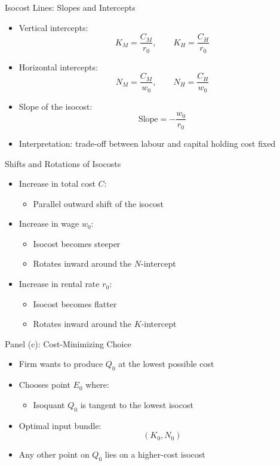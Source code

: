 \documentclass[aspectratio=169]{beamer}
\begin{document}

\begin{frame}{Isocost Lines: Slopes and Intercepts}
\begin{itemize}
\item Vertical intercepts:
\[
K_M = \frac{C_M}{r_0}, \qquad K_H = \frac{C_H}{r_0}
\]
\item Horizontal intercepts:
\[
N_M = \frac{C_M}{w_0}, \qquad N_H = \frac{C_H}{w_0}
\]
\item Slope of the isocost:
\[
\text{Slope} = -\frac{w_0}{r_0}
\]
\item Interpretation: trade-off between labour and capital holding cost fixed
\end{itemize}
\end{frame}


\begin{frame}{Shifts and Rotations of Isocosts}
\begin{itemize}
\item Increase in total cost $C$:
\begin{itemize}
\item Parallel outward shift of the isocost
\end{itemize}
\item Increase in wage $w_0$:
\begin{itemize}
\item Isocost becomes steeper
\item Rotates inward around the $N$-intercept
\end{itemize}
\item Increase in rental rate $r_0$:
\begin{itemize}
\item Isocost becomes flatter
\item Rotates inward around the $K$-intercept
\end{itemize}
\end{itemize}
\end{frame}


\begin{frame}{Panel (c): Cost-Minimizing Choice}
\begin{itemize}
\item Firm wants to produce $Q_0$ at the lowest possible cost
\item Chooses point $E_0$ where:
\begin{itemize}
\item Isoquant $Q_0$ is tangent to the lowest isocost
\end{itemize}
\item Optimal input bundle:
\[
(K_0, N_0)
\]
\item Any other point on $Q_0$ lies on a higher-cost isocost
\end{itemize}
\end{frame}
\end{document}
